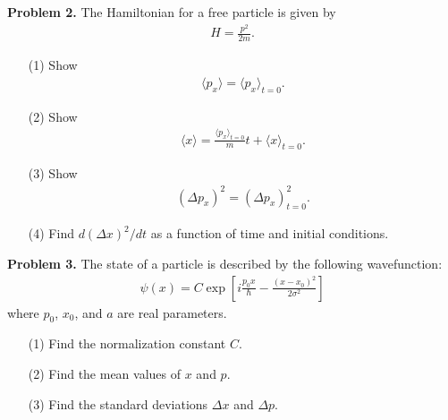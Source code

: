 \documentclass[floatfix,nofootinbib,superscriptaddress,fleqn]{revtex4}
\begin{document}
\noindent \textbf{Problem 2.} 
The Hamiltonian for a free particle is given by
\begin{align*}
H  = \frac{p^2}{2m}.
\end{align*}
\begin{itemize}
\item[(1)] Show 
  \begin{align*}
    \langle p_x \rangle = \langle p_x\rangle_{t=0}.
  \end{align*}
\item[(2)] Show 
  \begin{align*}
    \langle x \rangle = \frac{\langle p_x\rangle_{t=0}}{m} t + \langle
    x \rangle_{t=0}.
  \end{align*}
\item[(3)] Show 
  \begin{align*}
(\Delta p_x)^2 =  (\Delta p_x)_{t=0}^2  .
  \end{align*}
\item[(4)] Find $d(\Delta x)^2/dt$ as a function of time and initial 
  conditions. 
\end{itemize}
\newpage

\noindent \textbf{Problem 3.} 
The state of a particle is described by the following wavefunction:
\begin{align*}
\psi(x) = C\exp\left[
i\frac{p_0 x}{\hbar} - \frac{(x-x_0)^2}{2\sigma^2} 
\right]
\end{align*}
where $p_0$, $x_0$, and $a$ are real parameters. 
\begin{itemize}
\item[(1)] Find the normalization constant $C$.
\item[(2)] Find the mean values of $x$ and $p$.
\item[(3)] Find the standard deviations $\Delta x$ and $\Delta p$.
\end{itemize}
\vspace{1cm}
\end{document}
